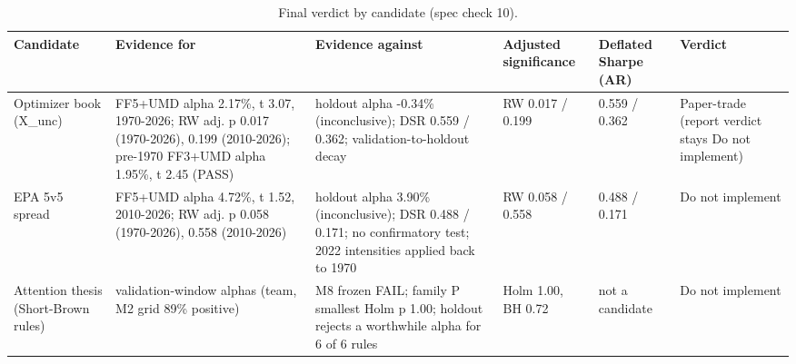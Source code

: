 \begin{table}[htbp]
\centering
\footnotesize
\caption{Final verdict by candidate (spec check 10).}
\label{tab:m7_verdict}
\begin{tabular}{p{2.1cm}p{3.3cm}p{3.3cm}p{1.7cm}p{1.5cm}p{1.9cm}}
\toprule
Candidate & Evidence for & Evidence against & Adjusted significance & Deflated Sharpe (AR) & Verdict \\
\midrule
Optimizer book (X\_unc) & FF5+UMD alpha 2.17\%, t 3.07, 1970-2026; RW adj. p 0.017 (1970-2026), 0.199 (2010-2026); pre-1970 FF3+UMD alpha 1.95\%, t 2.45 (PASS) & holdout alpha -0.34\% (inconclusive); DSR 0.559 / 0.362; validation-to-holdout decay & RW 0.017 / 0.199 & 0.559 / 0.362 & Paper-trade (report verdict stays Do not implement) \\
EPA 5v5 spread & FF5+UMD alpha 4.72\%, t 1.52, 2010-2026; RW adj. p 0.058 (1970-2026), 0.558 (2010-2026) & holdout alpha 3.90\% (inconclusive); DSR 0.488 / 0.171; no confirmatory test; 2022 intensities applied back to 1970 & RW 0.058 / 0.558 & 0.488 / 0.171 & Do not implement \\
Attention thesis (Short-Brown rules) & validation-window alphas (team, M2 grid 89\% positive) & M8 frozen FAIL; family P smallest Holm p 1.00; holdout rejects a worthwhile alpha for 6 of 6 rules & Holm 1.00, BH 0.72 & not a candidate & Do not implement \\
\bottomrule
\end{tabular}
\par{}
\end{table}
